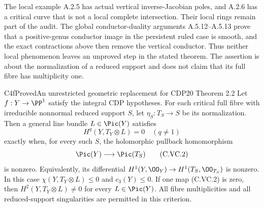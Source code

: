 The local example A.2.5 has actual vertical inverse-Jacobian
poles, and A.2.6 has a critical curve that is not a local
complete intersection. Their local rings remain part of the
audit. The global conductor-duality arguments A.5.12--A.5.13 prove
that a positive-genus conductor image in the persistent ruled
case is smooth, and the exact contractions above then remove
the vertical conductor. Thus neither local phenomenon leaves
an unproved step in the stated theorem. The assertion
is about the normalization of a reduced support and does not
claim that its full fibre has multiplicity one.

\begin{statement}{C4f}{Proved}{An unrestricted geometric replacement for CDP20 Theorem 2.2}
Let $f:Y\to\PP^1$ satisfy the integral CDP hypotheses.
For each critical full fibre with
irreducible nonnormal reduced support $S$, let
$\eta_S:T_S\to S$ be its normalization. Then a general
line bundle $L\in\Pic(Y)$ satisfies
\[
 H^q(Y,T_Y\otimes L)=0\quad(q\ne1)
 \tag{C.VC.1}
\]
exactly when, for every such $S$, the holomorphic pullback
homomorphism
\[
 \Pic(Y)\longrightarrow\Pic(T_S)
 \tag{C.VC.2}
\]
is nonzero. Equivalently, its differential
$H^1(Y,\OO_Y)\to H^1(T_S,\OO_{T_S})$ is nonzero.
In this case $\chi(Y,T_Y\otimes L)\le0$ and $c_3(Y)\le0$.
If one map (C.VC.2) is zero, then
$H^2(Y,T_Y\otimes L)\ne0$ for every $L\in\Pic(Y)$.
All fibre multiplicities and all reduced-support
singularities are permitted in this criterion.
\end{statement}
